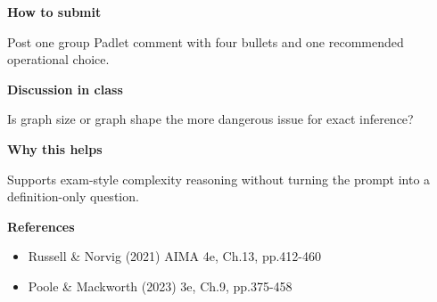 \documentclass[11pt]{article}
\begin{document}
\begin{tcolorbox}[colback=white,colframe=MidnightBlue,title={Q4 Collaborative Mini-Case},fonttitle=\bfseries,breakable]
{\large\bfseries\color{MidnightBlue} How to submit}\par\medskip
Post one group Padlet comment with four bullets and one recommended operational choice.

{\large\bfseries\color{MidnightBlue} Discussion in class}\par\medskip
Is graph size or graph shape the more dangerous issue for exact inference?

{\large\bfseries\color{MidnightBlue} Why this helps}\par\medskip
Supports exam-style complexity reasoning without turning the prompt into a definition-only question.

{\large\bfseries\color{MidnightBlue} References}\par\medskip
\begin{itemize}\item Russell \& Norvig (2021) AIMA 4e, Ch.13, pp.412-460
\item Poole \& Mackworth (2023) 3e, Ch.9, pp.375-458\end{itemize}
\end{tcolorbox}
\end{document}
